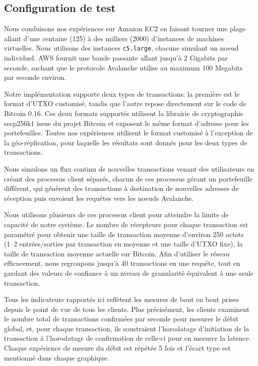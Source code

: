 \newcommand{\sysname}{Avalanche}

\subsection{Configuration de test}

Nous conduisons nos expériences sur Amazon EC2 en faisant tourner une plage allant d'une
centaine (125) à des milliers (2000) d'instances de machines virtuelles. Nous  utilisons
des instances \texttt{c5.large}, chacune simulant un noeud individuel. AWS fournit une bande passante
allant jusqu'à 2 Gigabits par seconde, sachant que le protocole {\sysname} utilise au maximum 100 Megabits
par seconde environ.

Notre implémentation supporte deux types de transactions: la première est le format d'UTXO
customisé, tandis que l'autre repose directement sur le code de Bitcoin 0.16. Ces deux formats
supportés utilisent la librairie de cryptographie secp256k1 issue du projet Bitcoin et exposent
le même format d'adresse pour les portefeuilles. Toutes nos expériences utilisent le format
customisé à l'exception de la géo-réplication, pour laquelle les résultats sont donnés pour
les deux types de transactions.

Nous simulons un flux continu de nouvelles transactions venant des utilisateurs en créant des
processus client séparés, chacun de ces processus gérant un portefeuille différent, qui génèrent
des transactions à destination de nouvelles adresses de réception puis envoient les requêtes vers
les noeuds {\sysname}.

Nous utilisons plusieurs de ces processus client pour atteindre la limite de capacité de notre
système. Le nombre de récepteurs pour chaque transaction est paramétré pour obtenir une taille
de transaction moyenne d'environ 250 octets (1--2 entrées/sorties par transaction en moyenne et
une taille d'UTXO fixe), la taille de transaction moyenne actuelle sur Bitcoin. Afin d'utiliser
le réseau efficacement, nous regroupons jusqu'à 40 transactions en une requête, tout en gardant
des valeurs de confiance à un niveau de granularité équivalent à une seule transaction.

Tous les indicateurs rapportés ici reflètent les mesures de bout en bout prises depuis le point
de vue de tous les clients. Plus précisément, les clients examinent le nombre total de transactions
confirmées par seconde pour mesurer le débit global, et, pour chaque transaction, ils soustraient
l'horodatage d'initiation de la transaction à l'horodatage de confirmation de celle-ci pour en
mesurer la latence. Chaque expérience de mesure du débit est répétée 5 fois et l'écart type est
mentionné dans chaque graphique.


